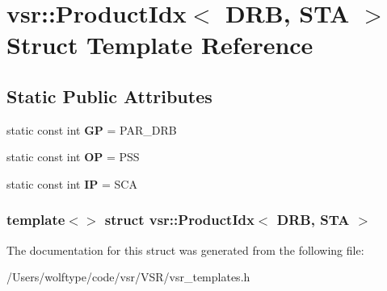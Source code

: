 \hypertarget{structvsr_1_1_product_idx_3_01_d_r_b_00_01_s_t_a_01_4}{\section{vsr\-:\-:Product\-Idx$<$ D\-R\-B, S\-T\-A $>$ Struct Template Reference}
\label{structvsr_1_1_product_idx_3_01_d_r_b_00_01_s_t_a_01_4}
}
\subsection*{Static Public Attributes}
\begin{DoxyCompactItemize}
\item 
\hypertarget{structvsr_1_1_product_idx_3_01_d_r_b_00_01_s_t_a_01_4_a9a8d9336a78363018697b02e5d5b6937}{static const int {\bfseries G\-P} = P\-A\-R\-\_\-\-D\-R\-B}\label{structvsr_1_1_product_idx_3_01_d_r_b_00_01_s_t_a_01_4_a9a8d9336a78363018697b02e5d5b6937}

\item 
\hypertarget{structvsr_1_1_product_idx_3_01_d_r_b_00_01_s_t_a_01_4_a643eb03fa7a6969449c527f3a77654b8}{static const int {\bfseries O\-P} = P\-S\-S}\label{structvsr_1_1_product_idx_3_01_d_r_b_00_01_s_t_a_01_4_a643eb03fa7a6969449c527f3a77654b8}

\item 
\hypertarget{structvsr_1_1_product_idx_3_01_d_r_b_00_01_s_t_a_01_4_a815490aff1a45c0f51560e134b42e0fe}{static const int {\bfseries I\-P} = S\-C\-A}\label{structvsr_1_1_product_idx_3_01_d_r_b_00_01_s_t_a_01_4_a815490aff1a45c0f51560e134b42e0fe}

\end{DoxyCompactItemize}
\subsubsection*{template$<$$>$ struct vsr\-::\-Product\-Idx$<$ D\-R\-B, S\-T\-A $>$}



The documentation for this struct was generated from the following file\-:\begin{DoxyCompactItemize}
\item 
/\-Users/wolftype/code/vsr/\-V\-S\-R/vsr\-\_\-templates.\-h\end{DoxyCompactItemize}
